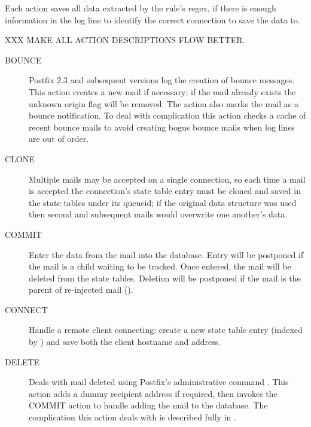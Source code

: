 \label{actions in detail in implementation}

Each action saves all data extracted by the rule's regex, if there is
enough information in the log line to identify the correct connection to
save the data to.

XXX MAKE ALL ACTION DESCRIPTIONS FLOW BETTER\@.  

\begin{description}

    \item [BOUNCE] Postfix 2.3 and subsequent versions log the creation of
        bounce messages.  This action creates a new mail if necessary; if
        the mail already exists the unknown origin flag will be removed.
        The action also marks the mail as a bounce notification.  To deal
        with complication  this action checks a cache of
        recent bounce mails to avoid creating bogus bounce mails when log
        lines are out of order.

    \item [CLONE] Multiple mails may be accepted on a single connection, so
        each time a mail is accepted the connection's state table entry
        must be cloned and saved in the state tables under its queueid; if
        the original data structure was used then second and subsequent
        mails would overwrite one another's data.

    \item [COMMIT] Enter the data from the mail into the database. Entry
        will be postponed if the mail is a child waiting to be tracked.
        Once entered, the mail will be deleted from the state tables.
        Deletion will be postponed if the mail is the parent of re-injected
        mail ().

    \item [CONNECT] Handle a remote client connecting: create a new state
        table entry (indexed by  ) and save both
        the client hostname and  address.

    \item [DELETE] Deals with mail deleted using Postfix's administrative
        command .  This action adds a dummy recipient
        address if required, then invokes the COMMIT action to handle
        adding the mail to the database.  The complication this action
        deals with is described fully in .  


\end{description}
